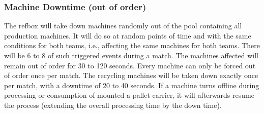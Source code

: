 \documentclass[12pt,twoside]{article}
\begin{document}
\subsubsection{Machine Downtime (out of order)}
\label{sec:out-of-order}
The refbox will take down machines randomly out of the pool containing
all production machines. It will do so at random points of time and
with the same conditions for both teams, i.e., affecting the same
machines for both teams. There will be 6 to 8 of such triggered events
during a match. The machines affected will remain out of order for 30
to 120 seconds. Every machine can only be forced out of order once per
match. The recycling machines will be taken down exactly once per
match, with a downtime of 20 to 40 seconds. If a machine turns offline
during processing or consumption of mounted a pallet carrier, it will
afterwards resume the process (extending the overall processing time
by the down time).
\end{document}
